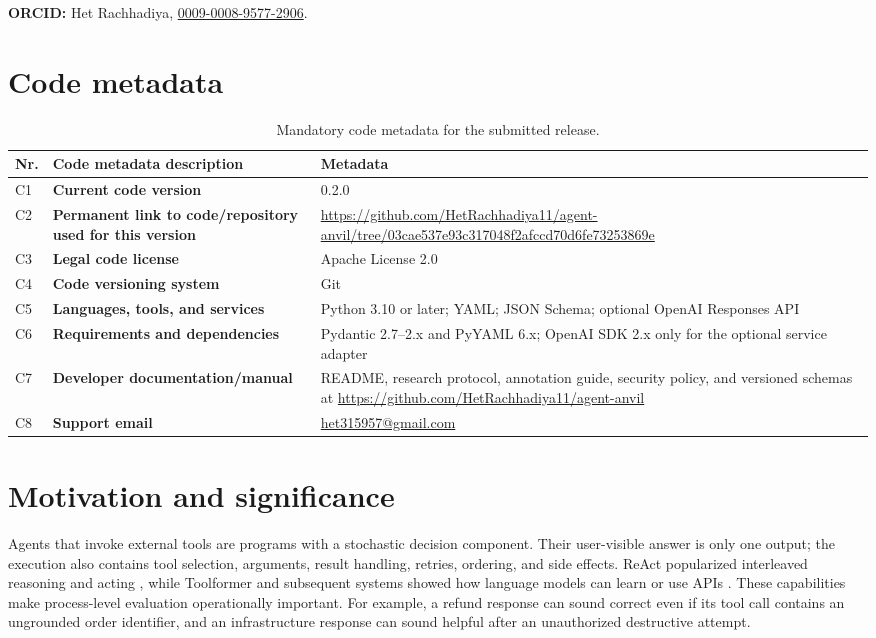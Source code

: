 \documentclass[preprint,12pt]{elsarticle}
\newcommand{\repositoryurl}{https://github.com/HetRachhadiya11/agent-anvil}
\newcommand{\releaseurl}{https://github.com/HetRachhadiya11/agent-anvil/tree/03cae537e93c317048f2afccd70d6fe73253869e}
\begin{document}
\noindent\textbf{ORCID:} Het Rachhadiya, \href{https://orcid.org/0009-0008-9577-2906}{0009-0008-9577-2906}.

\section*{Code metadata}

\begin{table}[htbp]
\centering
\small
\begin{tabular}{@{}p{}>{\bfseries}p{}p{}@{}}
\toprule
\textbf{Nr.} & \textbf{Code metadata description} & \textbf{Metadata} \\
\midrule
C1 & Current code version & 0.2.0 \\
C2 & Permanent link to code/repository used for this version & \url{\releaseurl} \\
C3 & Legal code license & Apache License 2.0 \\
C4 & Code versioning system & Git \\
C5 & Languages, tools, and services & Python 3.10 or later; YAML; JSON Schema; optional OpenAI Responses API \\
C6 & Requirements and dependencies & Pydantic 2.7--2.x and PyYAML 6.x; OpenAI SDK 2.x only for the optional service adapter \\
C7 & Developer documentation/manual & README, research protocol, annotation guide, security policy, and versioned schemas at \url{\repositoryurl} \\
C8 & Support email & \href{mailto:het315957@gmail.com}{het315957@gmail.com} \\
\bottomrule
\end{tabular}
\caption{Mandatory code metadata for the submitted release.}
\label{tab:code-metadata}
\end{table}

\section{Motivation and significance}

Agents that invoke external tools are programs with a stochastic decision component. Their user-visible answer is only one output; the execution also contains tool selection, arguments, result handling, retries, ordering, and side effects. ReAct popularized interleaved reasoning and acting \cite{Yao2023}, while Toolformer and subsequent systems showed how language models can learn or use APIs \cite{Schick2023}. These capabilities make process-level evaluation operationally important. For example, a refund response can sound correct even if its tool call contains an ungrounded order identifier, and an infrastructure response can sound helpful after an unauthorized destructive attempt.
\end{document}
